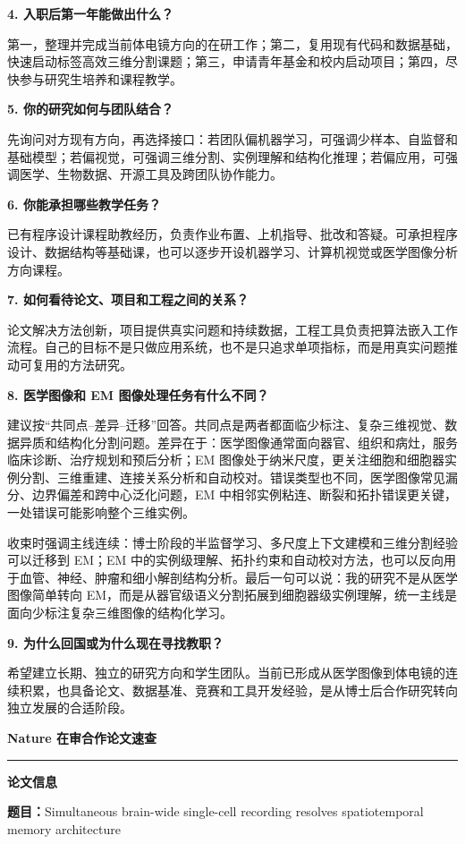 \documentclass[11pt,a4paper]{ctexart}
\newcommand{\sectionbar}[1]{%
  \vspace{0.35em}
  {\large\bfseries\sffamily\color{accent} #1}\par
  \vspace{-0.35em}\color{accent}\rule{\textwidth}{0.7pt}\color{black}\vspace{0.2em}
}
\newcommand{\prompt}[1]{\textbf{\color{accent}#1}}
\begin{document}
\prompt{4. 入职后第一年能做出什么？}

第一，整理并完成当前体电镜方向的在研工作；第二，复用现有代码和数据基础，快速启动标签高效三维分割课题；第三，申请青年基金和校内启动项目；第四，尽快参与研究生培养和课程教学。

\prompt{5. 你的研究如何与团队结合？}

先询问对方现有方向，再选择接口：若团队偏机器学习，可强调少样本、自监督和基础模型；若偏视觉，可强调三维分割、实例理解和结构化推理；若偏应用，可强调医学、生物数据、开源工具及跨团队协作能力。

\prompt{6. 你能承担哪些教学任务？}

已有程序设计课程助教经历，负责作业布置、上机指导、批改和答疑。可承担程序设计、数据结构等基础课，也可以逐步开设机器学习、计算机视觉或医学图像分析方向课程。

\prompt{7. 如何看待论文、项目和工程之间的关系？}

论文解决方法创新，项目提供真实问题和持续数据，工程工具负责把算法嵌入工作流程。自己的目标不是只做应用系统，也不是只追求单项指标，而是用真实问题推动可复用的方法研究。

\prompt{8. 医学图像和 EM 图像处理任务有什么不同？}

建议按“共同点--差异--迁移”回答。共同点是两者都面临少标注、复杂三维视觉、数据异质和结构化分割问题。差异在于：医学图像通常面向器官、组织和病灶，服务临床诊断、治疗规划和预后分析；EM 图像处于纳米尺度，更关注细胞和细胞器实例分割、三维重建、连接关系分析和自动校对。错误类型也不同，医学图像常见漏分、边界偏差和跨中心泛化问题，EM 中相邻实例粘连、断裂和拓扑错误更关键，一处错误可能影响整个三维实例。

收束时强调主线连续：博士阶段的半监督学习、多尺度上下文建模和三维分割经验可以迁移到 EM；EM 中的实例级理解、拓扑约束和自动校对方法，也可以反向用于血管、神经、肿瘤和细小解剖结构分析。最后一句可以说：我的研究不是从医学图像简单转向 EM，而是从器官级语义分割拓展到细胞器级实例理解，统一主线是面向少标注复杂三维图像的结构化学习。

\prompt{9. 为什么回国或为什么现在寻找教职？}

希望建立长期、独立的研究方向和学生团队。当前已形成从医学图像到体电镜的连续积累，也具备论文、数据基准、竞赛和工具开发经验，是从博士后合作研究转向独立发展的合适阶段。

\endgroup

\newpage
\sectionbar{Nature 在审合作论文速查}

\prompt{论文信息}

\textbf{题目：}Simultaneous brain-wide single-cell recording resolves spatiotemporal memory architecture
\end{document}
